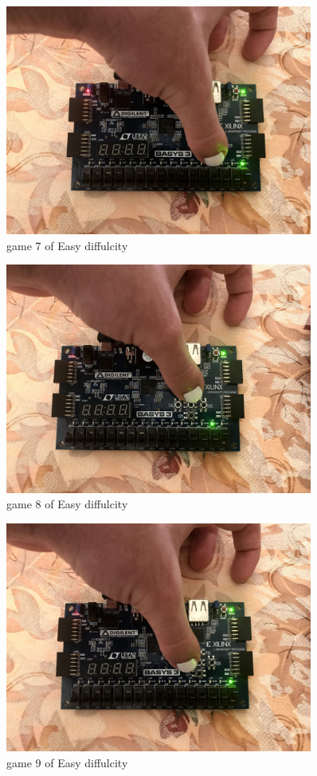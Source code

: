 \documentclass[11pt]{article}
\begin{document}
\begin{figure}
	\includegraphics[width=0.9\textwidth]{IMG_1317.jpg}
	\caption{game 7 of Easy diffulcity }
	\label{fig:sim_with_table}
\end{figure}
\begin{figure}
	\includegraphics[width=0.9\textwidth]{IMG_1318.jpg}
	\caption{game 8 of Easy diffulcity }
	\label{fig:sim_with_table}
\end{figure}
\begin{figure}
	\includegraphics[width=0.9\textwidth]{IMG_1319.jpg}
	\caption{game 9 of Easy diffulcity }
	\label{fig:sim_with_table}
\end{figure}
\end{document}
